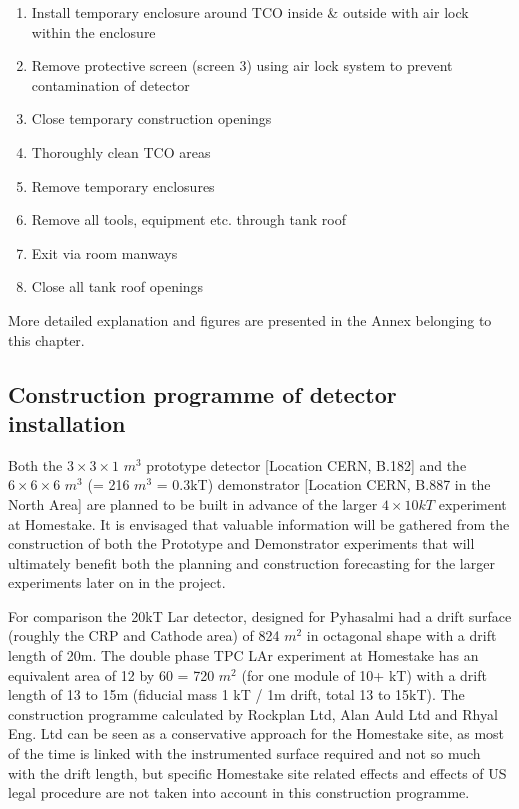 \begin{enumerate}
\item{Install temporary enclosure around TCO inside \& outside with air lock within the enclosure}
\item{ Remove protective screen (screen 3) using air lock system to prevent contamination of detector}
\item{Close temporary construction openings}
\item{Thoroughly clean TCO areas}
\item{Remove temporary enclosures}
\item{Remove all tools, equipment etc. through tank roof}
\item{Exit via room manways}
\item{Close all tank roof openings}
\end{enumerate}

More detailed explanation and figures are presented in the Annex belonging to this chapter.

\subsection{Construction programme of detector installation}
Both the $3\times3\times1$ $m^3$ prototype detector [Location CERN, B.182] and the $6\times 6\times 6$ $m^3$  (= 216 $m^3$ = 0.3kT) demonstrator [Location CERN, B.887 in the North Area] are planned to be built in advance of the larger $4\times 10kT$ experiment at Homestake.  It is envisaged that valuable information will be gathered from the construction of both the Prototype and Demonstrator experiments that will ultimately benefit both the planning and construction forecasting for the larger experiments later on in the project.

For comparison the 20kT Lar detector, designed for Pyhasalmi had a drift surface (roughly the CRP and Cathode area) of 824 $m^2$ in octagonal shape with a drift length of 20m. The double phase TPC LAr experiment at Homestake has an equivalent area of 12 by 60 = 720 $m^2$ (for one module of 10+ kT) with a drift length of 13 to 15m (fiducial mass 1 kT / 1m drift, total 13 to 15kT). The construction programme calculated by Rockplan Ltd, Alan Auld Ltd and Rhyal Eng. Ltd can be seen as a conservative approach for the Homestake site, as most of the time is linked with the instrumented surface required and not so much with the drift length, but specific Homestake site related effects and effects of US legal procedure are not taken into account in this construction programme.

